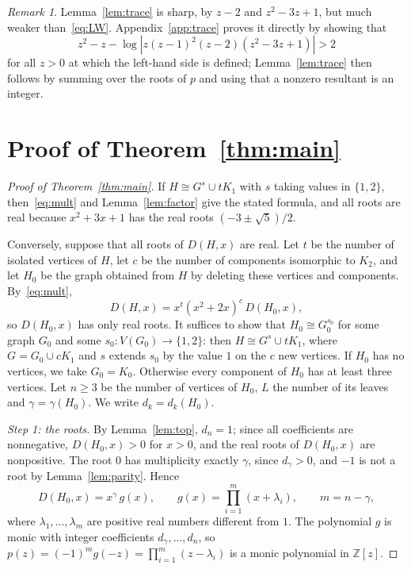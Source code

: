 \documentclass{amsart}
\theoremstyle{definition}
\theoremstyle{remark}
\newtheorem{remark}[theorem]{Remark}
\numberwithin{equation}{section}
\newcommand{\Z}{\mathbb{Z}}
\begin{document}
\begin{remark}\label{rem:selfcontained}
Lemma~\ref{lem:trace} is sharp, by $z-2$ and $z^2-3z+1$, but much weaker than~\eqref{eq:LW}. Appendix~\ref{app:trace} proves it directly by showing that
\[
z^2-z-\log|z(z-1)^2(z-2)(z^2-3z+1)|>2
\]
for all $z>0$ at which the left-hand side is defined; Lemma~\ref{lem:trace} then follows by summing over the roots of $p$ and using that a nonzero resultant is an integer.
\end{remark}

\section{Proof of Theorem~\ref{thm:main}}\label{sec:proof}

\begin{proof}[Proof of Theorem~\ref{thm:main}]
If $H\cong G^s\cup tK_1$ with $s$ taking values in $\{1,2\}$, then~\eqref{eq:mult} and Lemma~\ref{lem:factor} give the stated formula, and all roots are real because $x^2+3x+1$ has the real roots $(-3\pm\sqrt5)/2$.

Conversely, suppose that all roots of $D(H,x)$ are real. Let $t$ be the number of isolated vertices of $H$, let $c$ be the number of components isomorphic to $K_2$, and let $H_0$ be the graph obtained from $H$ by deleting these vertices and components. By~\eqref{eq:mult},
\[
D(H,x)=x^t(x^2+2x)^c\,D(H_0,x),
\]
so $D(H_0,x)$ has only real roots. It suffices to show that $H_0\cong G_0^{s_0}$ for some graph $G_0$ and some $s_0\colon V(G_0)\to\{1,2\}$: then $H\cong G^s\cup tK_1$, where $G=G_0\cup cK_1$ and $s$ extends $s_0$ by the value $1$ on the $c$ new vertices. If $H_0$ has no vertices, we take $G_0=K_0$. Otherwise every component of $H_0$ has at least three vertices. Let $n\ge 3$ be the number of vertices of $H_0$, $L$ the number of its leaves and $\gamma=\gamma(H_0)$. We write $d_k=d_k(H_0)$.

\emph{Step 1: the roots.} By Lemma~\ref{lem:top}, $d_n=1$; since all coefficients are nonnegative, $D(H_0,x)>0$ for $x>0$, and the real roots of $D(H_0,x)$ are nonpositive. The root $0$ has multiplicity exactly $\gamma$, since $d_\gamma>0$, and $-1$ is not a root by Lemma~\ref{lem:parity}. Hence
\[
D(H_0,x)=x^\gamma\,g(x),\qquad g(x)=\prod_{i=1}^m(x+\lambda_i),\qquad m=n-\gamma,
\]
where $\lambda_1,\dots,\lambda_m$ are positive real numbers different from $1$. The polynomial $g$ is monic with integer coefficients $d_\gamma,\dots,d_n$, so $p(z)=(-1)^mg(-z)=\prod_{i=1}^m(z-\lambda_i)$ is a monic polynomial in $\Z[z]$.


\end{proof}
\end{document}
